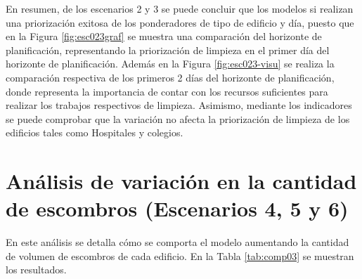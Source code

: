 \documentclass[letterpaper,conference]{IEEEtran}
\begin{document}
En resumen, de los escenarios 2 y 3 se puede concluir que los modelos si realizan una priorización exitosa de los ponderadores de tipo de edificio y día, puesto que en la Figura \ref{fig:esc023graf} se muestra una comparación del horizonte de planificación, representando la priorización de limpieza en el primer día del horizonte de planificación. Además en la Figura \ref{fig:esc023-visu} se realiza la comparación respectiva de los primeros 2 días del horizonte de planificación, donde representa la importancia de contar con los recursos suficientes para realizar los trabajos respectivos de limpieza. Asimismo, mediante los indicadores se puede comprobar que la variación no afecta la priorización de limpieza de los edificios tales como Hospitales y colegios.

\section{Análisis de variación en la cantidad de escombros (Escenarios 4, 5 y 6)}

En este análisis se detalla cómo se comporta el modelo aumentando la cantidad de volumen de escombros de cada edificio. En la Tabla \ref{tab:comp03} se muestran los resultados.
\end{document}
